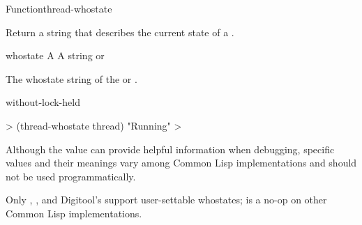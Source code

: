 \documentclass[10pt,twoside,english,pdftex]{article}
\begin{document}
\begin{functiondoc}{Function}{thread-whostate}{
    }

\fnsyntax

\fnpurpose Return a string that describes the current state of a 
.

\fnsetf
{}%
  {}{}

\fnpackage {}

\fnmodule {}

\fnargs
\begin{args}{whostate}
\arg[thread] A 
\arg[whostate] A string or \nil{}
\end{args}

\fnreturns The whostate string of the  or \nil.

\fnerrors
\nothreads{}

\begin{alsos}{without-lock-held}
\end{alsos}

\fnexample
%
\W\supp
\begin{example}
  > (thread-whostate thread)
  "Running"
  >
\end{example}

\fnnote Although the  value can provide helpful information
when debugging, specific  values and their meanings
vary among Common Lisp implementations and should not be used
programmatically.

Only , , and Digitool's  support user-settable whostates;
 is a no-op on other Common Lisp
implementations.

\end{functiondoc}

\end{document}
